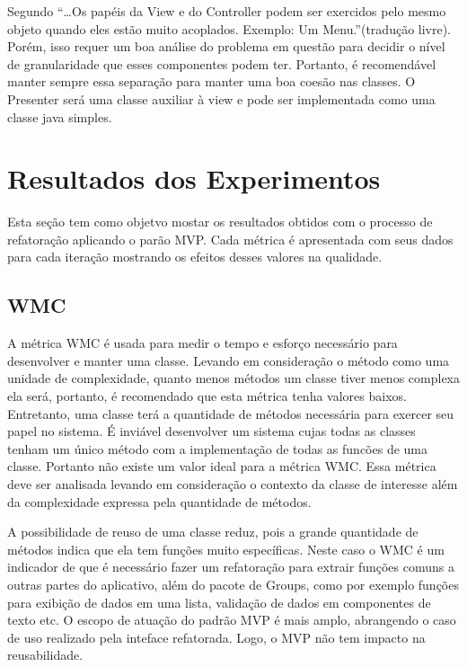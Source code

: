 Segundo  ``\ldots Os papéis da View e do
Controller podem ser exercidos pelo mesmo objeto quando eles estão muito
acoplados. Exemplo: Um Menu.''(tradução livre). Porém, isso requer um boa
análise do problema em questão para decidir o nível de granularidade que esses componentes podem ter.
Portanto, é recomendável manter sempre essa separação para manter uma boa coesão
nas classes. O Presenter será uma classe auxiliar à view e pode ser implementada
como uma classe java simples. 



\section{Resultados dos Experimentos}

Esta seção tem como objetvo mostar os resultados obtidos com o processo de
refatoração aplicando o parão MVP. Cada métrica é apresentada com seus dados
para cada iteração mostrando os efeitos desses valores na qualidade.

\subsection{WMC}

A métrica WMC é usada para medir o tempo e esforço necessário para desenvolver e
manter uma classe. Levando em consideração o método como uma unidade de
complexidade, quanto menos métodos um classe tiver menos complexa ela será,
portanto, é recomendado que esta métrica tenha valores baixos.
Entretanto, uma classe terá a quantidade de métodos necessária para exercer seu
papel no sistema. É inviável desenvolver um sistema cujas todas as classes
tenham um único método com a implementação de todas as funcões de uma
classe. Portanto não existe um valor ideal para a métrica WMC. Essa métrica deve
ser analisada levando em consideração o contexto da classe de interesse além da
complexidade expressa pela quantidade de métodos. 

A possibilidade de reuso de uma classe reduz, pois a grande quantidade de
métodos indica que ela tem funções muito específicas\cite{cksuite}. Neste caso o
WMC é um indicador de que é necessário fazer um refatoração para extrair funções comuns a outras partes do
aplicativo, além do pacote de Groups, como por exemplo funções para exibição de
dados em uma lista, validação de dados em componentes de texto etc. O escopo de
atuação do padrão MVP é mais amplo, abrangendo o caso de uso realizado pela
inteface refatorada. Logo, o MVP não tem impacto na reusabilidade.

